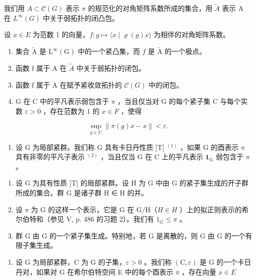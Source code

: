 我们用 \(A \subset \mathcal{C}(G)\) 表示 \(\pi\) 的规范化的对角矩阵系数所成的集合，用 \(\widetilde{A}\) 表示 A 在 \(L^{\infty}(G)\) 中关于弱拓扑的闭凸包。

设 \(x \in E\) 为范数 1 的向量，\(f: g \mapsto \langle x \mid \varrho(g)x \rangle\) 为相伴的对角矩阵系数。

\begin{enumerate}
\def\labelenumi{\alph{enumi})}
\item
  集合 \(\widetilde{\mathrm{A}}\) 是 \(\mathrm{L}^{\infty}(\mathrm{G})\) 中的一个紧凸集，而 \(f\) 是 \(\widetilde{\mathrm{A}}\) 的一个极点。
\item
  函数 f 属于 A 在 \(\widetilde{A}\) 中关于弱拓扑的闭包。
\item
  函数 f 属于 A 在赋予紧收敛拓扑的 \(\mathcal{C}(G)\) 中的闭包。
\item
  G 在 C 中的平凡表示弱包含于 \(\pi\) ，当且仅当对 G 的每个紧子集 C 与每个实数 \(\varepsilon > 0\) ，存在范数为 1 的 \(x \in F\) ，使得
\end{enumerate}

\[
\sup _ {g \in \mathrm{C}} \| \pi (g) x - x \| <   \varepsilon .
\]

\begin{enumerate}
\def\labelenumi{\arabic{enumi})}
\setcounter{enumi}{13}
\tightlist
\item
  设 G 为局部紧群。我们称 G 具有卡日丹性质 ]T[ \(^{(1)}\) ，如果 G 的酉表示 \(\pi\) 具有非零的平凡子表示 \(^{(2)}\) ，当且仅当 G 在 C 上的平凡表示 \(\mathbf{1}_{\text{G}}\) 弱包含于 \(\pi\) 。
\end{enumerate}

\begin{enumerate}
\def\labelenumi{\alph{enumi})}
\item
  设 G 为具有性质 ]T[ 的局部紧群。设 H 为 G 中由 G 的紧子集生成的开子群所成的集合。群 G 是诸子群 H ∈ H 的并。
\item
  设 \(\pi\) 为 G 的这样一个表示，它是 G 在 G/H（\(H \in H\) ）上的拟正则表示的希尔伯特和（参见 V, p. 486 的习题 2）。我们有 \(1_{G} \leqslant \pi\) 。
\item
  群 G 由 G 的一个紧子集生成。特别地，若 G 是离散的，则 G 由 G 的一个有限子集生成。
\end{enumerate}

\begin{enumerate}
\def\labelenumi{\arabic{enumi})}
\setcounter{enumi}{14}
\tightlist
\item
  设 G 为局部紧群，C 为 G 的子集，\(\varepsilon > 0\) 。我们称 \((\mathrm{C}, \varepsilon)\) 是 G 的一个卡日丹对，如果对 G 在希尔伯特空间 E 中的每个酉表示 \(\pi\) ，存在向量 \(x \in E\)
\end{enumerate}

